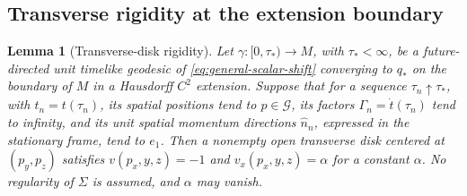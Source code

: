 \documentclass[10pt]{article}
\newtheorem{lemma}[theorem]{Lemma}
\begin{document}
\subsection{Transverse rigidity at the extension boundary}

\begin{lemma}[Transverse-disk rigidity]
\label{lem:transverse-disk-rigidity}
Let \(\gamma:[0,\tau_*)\to M\), with \(\tau_*<\infty\), be a
future-directed unit timelike geodesic of \eqref{eq:general-scalar-shift}
converging to \(q_*\) on the boundary of \(M\) in a Hausdorff \(C^2\)
extension.  Suppose that for a sequence \(\tau_n\uparrow\tau_*\), with
\(t_n=t(\tau_n)\), its spatial positions tend to \(p\in\mathcal G\), its
factors \(\Gamma_n=\dot t(\tau_n)\) tend to infinity, and its unit spatial
momentum directions \(\widehat n_n\), expressed in the stationary frame,
tend to \(e_1\).  Then a nonempty open transverse
disk centered at \((p_y,p_z)\) satisfies
\(v(p_x,y,z)=-1\) and \(v_x(p_x,y,z)=\alpha\) for a constant \(\alpha\).
No regularity of \(\Sigma\) is assumed, and \(\alpha\) may vanish.
\end{lemma}
\end{document}

